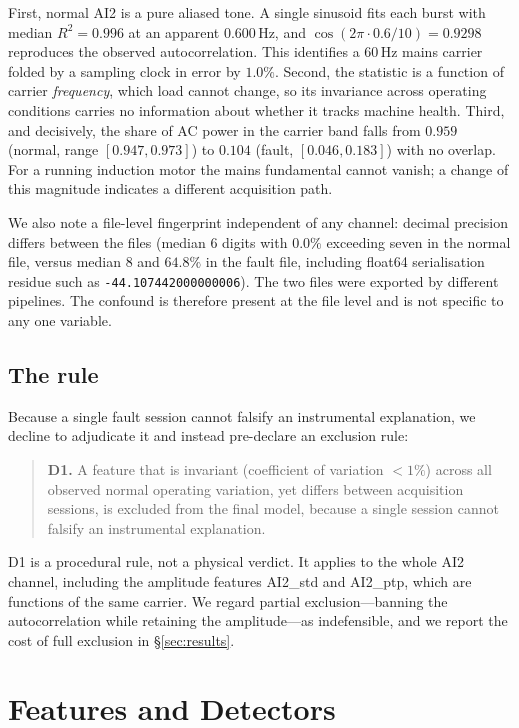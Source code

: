 \documentclass[twocolumn,10pt]{article}
\begin{document}
First, normal \textsf{AI2} is a pure aliased tone. A single sinusoid fits each
burst with median $R^2 = 0.996$ at an apparent $0.600$\,Hz, and
$\cos(2\pi\cdot0.6/10) = 0.9298$ reproduces the observed autocorrelation. This
identifies a $60$\,Hz mains carrier folded by a sampling clock in error by
$1.0\%$. Second, the statistic is a function of carrier \emph{frequency}, which
load cannot change, so its invariance across operating conditions carries no
information about whether it tracks machine health. Third, and decisively, the
share of AC power in the carrier band falls from $0.959$ (normal, range
$[0.947,0.973]$) to $0.104$ (fault, $[0.046,0.183]$) with no overlap. For a
running induction motor the mains fundamental cannot vanish; a change of this
magnitude indicates a different acquisition path.

We also note a file-level fingerprint independent of any channel: decimal
precision differs between the files (median $6$ digits with $0.0\%$ exceeding
seven in the normal file, versus median $8$ and $64.8\%$ in the fault file,
including float64 serialisation residue such as
\texttt{-44.107442000000006}). The two files were exported by different
pipelines. The confound is therefore present at the file level and is not
specific to any one variable.

\subsection{The rule}

Because a single fault session cannot falsify an instrumental explanation, we
decline to adjudicate it and instead pre-declare an exclusion rule:

\begin{quote}\small
\textbf{D1.} A feature that is invariant (coefficient of variation $<1\%$)
across all observed normal operating variation, yet differs between acquisition
sessions, is excluded from the final model, because a single session cannot
falsify an instrumental explanation.
\end{quote}

D1 is a procedural rule, not a physical verdict. It applies to the whole
\textsf{AI2} channel, including the amplitude features \textsf{AI2\_std} and
\textsf{AI2\_ptp}, which are functions of the same carrier. We regard partial
exclusion---banning the autocorrelation while retaining the amplitude---as
indefensible, and we report the cost of full exclusion in
\S\ref{sec:results}.

\section{Features and Detectors}
\label{sec:method}
\end{document}
